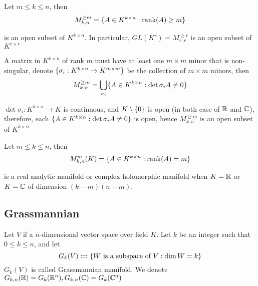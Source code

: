 \begin{proposition}
	Let $m \leq k \leq n$, then
	$$
	M_{k, n}^{\geq m} = \{A \in K^{k \times n}: \operatorname{rank}(A) \geq m\}
	$$
	
	is an open subset of $K^{k \times n}$. In particular, $GL(K^r) = M_{r, r}^{\geq r}$ is an open subset of $K^{r \times r}$
	\begin{longproof}
		A matrix in $K^{k \times n}$ of rank $m$ must have at least one $m \times m$ minor that is non-singular, denote $\{\sigma_i: K^{k \times n} \to K^{m \times m}\}$ be the collection of $m \times m$ minors, then
		$$
		M_{k, n}^{\geq m} = \bigcup_{\sigma_i} \{A \in K^{k \times n}: \det \sigma_i A \neq 0\}
		$$
		
		$\det \sigma_i: K^{k \times n} \to K$ is continuous, and $K \setminus \{0\}$ is open (in both case of $\mathbb{R}$ and $\mathbb{C}$), therefore, each $\{A \in K^{k \times n}: \det \sigma_i A \neq 0\}$ is open, hence $M_{k, n}^{\geq m}$ is an open subset of $K^{k \times n}$
	\end{longproof}
\end{proposition}

\begin{proposition}
	Let $m \leq k \leq n$, then
	$$
	M_{k, n}^m(K) = \{A \in K^{k \times n}: \operatorname{rank}(A) = m\}
	$$
	
	is a real analytic manifold or complex holomorphic manifold when $K = \mathbb{R}$ or $K = \mathbb{C}$ of dimension $(k-m)(n-m)$.
	\begin{longproof}
	\end{longproof}
\end{proposition}




\subsection{Grassmannian}

\begin{definition}[Grassmannian]
	Let $V$ if a $n$-dimensional vector space over field $K$. Let $k$ be an integer such that $0 \leq k \leq n$, and let
	$$
	G_k(V) := \{W \text{ is a subspace of } V: \dim W = k\}
	$$
	$G_k(V)$ is called Grassmannian manifold. We denote $G_{k, n}(\mathbb{R}) = G_k(\mathbb{R}^n), G_{k, n}(\mathbb{C}) = G_k(\mathbb{C}^n)$
\end{definition}

